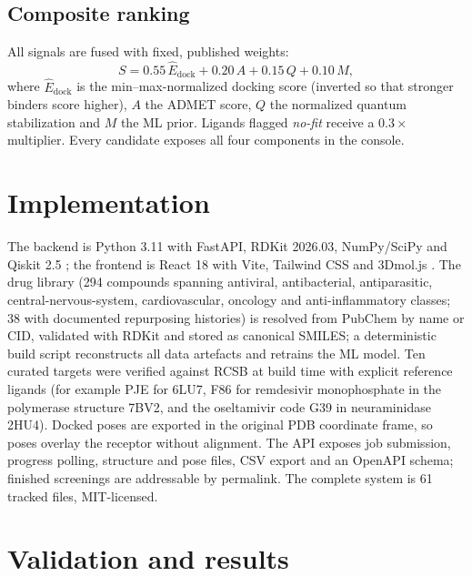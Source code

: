 \documentclass[10pt,a4paper,twocolumn]{article}
\begin{document}
\subsection{Composite ranking}

All signals are fused with fixed, published weights:
\begin{equation}
S = 0.55\,\widehat{E}_{\text{dock}} + 0.20\,A + 0.15\,Q + 0.10\,M,
\label{eq:composite}
\end{equation}
where $\widehat{E}_{\text{dock}}$ is the min--max-normalized docking score (inverted so
that stronger binders score higher), $A$ the ADMET score, $Q$ the normalized quantum
stabilization and $M$ the ML prior. Ligands flagged \emph{no-fit} receive a
$0.3\times$ multiplier. Every candidate exposes all four components in the console.

\section{Implementation}

The backend is Python 3.11 with FastAPI, RDKit 2026.03, NumPy/SciPy and Qiskit 2.5
\cite{rdkit,qiskit2024}; the frontend is React 18 with Vite, Tailwind CSS and 3Dmol.js
\cite{rego2015}. The drug library (294 compounds spanning antiviral, antibacterial,
antiparasitic, central-nervous-system, cardiovascular, oncology and anti-inflammatory
classes; 38 with documented repurposing histories) is resolved from PubChem by name or
CID, validated with RDKit and stored as canonical SMILES; a deterministic build script
reconstructs all data artefacts and retrains the ML model. Ten curated targets were
verified against RCSB at build time with explicit reference ligands (for example PJE
for 6LU7, F86 for remdesivir monophosphate in the polymerase structure 7BV2, and the
oseltamivir code G39 in neuraminidase 2HU4). Docked poses are exported in the original
PDB coordinate frame, so poses overlay the receptor without alignment. The API exposes
job submission, progress polling, structure and pose files, CSV export and an OpenAPI
schema; finished screenings are addressable by permalink. The complete system is 61
tracked files, MIT-licensed.

\section{Validation and results}
\label{sec:results}
\end{document}
